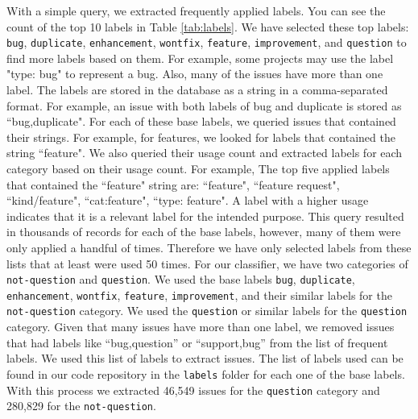 \documentclass[conference]{IEEEtran}
\begin{document}
With a simple query, we extracted frequently applied labels. You 
can see the count of the top 10 labels in Table \ref{tab:labels}. 
We have selected these top labels: \verb|bug|, \verb|duplicate|, \verb|enhancement|, \verb|wontfix|,
\verb|feature|, \verb|improvement|, and \verb|question| to find more labels based on them.
For example, some projects may use the label "type: bug" to represent a bug. Also, many of the issues 
have more than one label. The labels are stored in the database as a string in a comma-separated format. 
For example, an issue with both labels of bug and duplicate is stored as ``bug,duplicate". 
For each of these base labels, we queried issues that contained their strings. For example,
for features, we looked for labels that contained the string ``feature". We also queried their usage count and
extracted labels for each category based on their usage count.
For example, The top five applied labels that contained the ``feature" string 
are: ``feature", ``feature request", ``kind/feature", ``cat:feature", ``type: feature".
A label with a higher usage indicates that it is a relevant label for the intended purpose. This query resulted
in thousands of records for each of the base labels, however, many of them were only applied
a handful of times. Therefore we have only selected labels from these lists that 
at least were used 50 times. For our classifier, we have two categories of \verb|not-question| 
and \verb|question|. We used the base labels \verb|bug|, \verb|duplicate|, \verb|enhancement|, \verb|wontfix|,
\verb|feature|, \verb|improvement|, and their similar labels for the \verb|not-question| category. We used
the \verb|question| or similar labels for the \verb|question| category. Given that many issues have 
more than one label, we removed issues that had labels like ``bug,question'' or ``support,bug'' from 
the list of frequent labels. We used this list of labels to extract issues. The list of labels
used can be found in our code repository in the \verb|labels| folder for each one of the base labels.
With this process we extracted 46,549 issues for the \verb|question| category and 280,829 for 
the \verb|not-question|.
\end{document}
